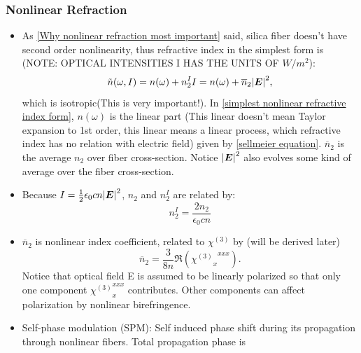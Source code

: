 \documentclass[12pt]{extarticle}
\numberwithin{equation}{section}
\numberwithin{figure}{section}
\numberwithin{table}{section}
\newcommand{\<}{\langle}
\renewcommand{\>}{\rangle}
\theoremstyle{definition}
\begin{document}
        \subsubsection{Nonlinear Refraction}
            \begin{itemize}
                \item As \ref{Why nonlinear refraction most important} said, silica fiber doesn't have second order nonlinearity, thus refractive index in the simplest form is (\MakeUppercase{Note: optical intensities I has the units of $W/m^2$}):
                    \begin{equation}
                        \Tilde{n}(\omega,I) = n(\omega) + n_2^I I = n(\omega) + \overline{n}_2\abs{\boldsymbol{E}}^2,
                        \label{simplest nonlinear refractive index form}
                    \end{equation}
                    which is isotropic(This is very important!). In \autoref{simplest nonlinear refractive index form}, $n(\omega)$ is the linear part (This linear doesn't mean Taylor expansion to 1st order, this linear means a linear process, which refractive index has no relation with electric field) given by \autoref{sellmeier equation}. $\overline{n}_2$ is the average $n_2$ over fiber cross-section. Notice $\abs{\boldsymbol{E}}^2$ also evolves some kind of average over the fiber cross-section.
                \item Because $I=\frac{1}{2}\epsilon_0 c n \abs{\boldsymbol{E}}^2$, $n_2$ and $n_2^I$ are related by:
                    \begin{equation}
                        \label{n2 and n2I relation}
                        n_2^I = \frac{2n_2}{\epsilon_0 c n}
                    \end{equation}
                \item $\overline{n}_2$ is nonlinear index coefficient, related to  $\chi^{(3)}$ by (will be derived later)
                    \begin{equation}
                        \overline{n}_2 = \frac{3}{8n} \Re({{ \chi^{(3)} }_x}^{xxx}).
                        \label{n2 bar relation with chi3}
                    \end{equation}
                    Notice that optical field E is assumed to be linearly polarized so that only one component ${ \chi^{(3)} }_x^{xxx}$ contributes. Other components can affect polarization by nonlinear birefringence.
                \item Self-phase modulation (SPM): Self induced phase shift during its propagation through nonlinear fibers. Total propagation phase is

\end{itemize}
\end{document}
